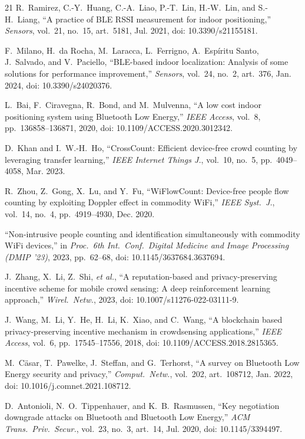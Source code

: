 \documentclass[journal,10pt]{IEEEtran}
\begin{document}
\begin{thebibliography}{21}
 R.~Ramirez, C.-Y.~Huang, C.-A.~Liao, P.-T.~Lin, H.-W.~Lin,
and S.-H.~Liang, ``A practice of BLE RSSI measurement for indoor positioning,''
\emph{Sensors}, vol.~21, no.~15, art.~5181, Jul. 2021, doi: 10.3390/s21155181.

 F.~Milano, H.~da Rocha, M.~Laracca, L.~Ferrigno,
A.~Esp\'iritu Santo, J.~Salvado, and V.~Paciello, ``BLE-based indoor
localization: Analysis of some solutions for performance improvement,''
\emph{Sensors}, vol.~24, no.~2, art.~376, Jan. 2024, doi: 10.3390/s24020376.

 L.~Bai, F.~Ciravegna, R.~Bond, and M.~Mulvenna, ``A low cost
indoor positioning system using Bluetooth Low Energy,'' \emph{IEEE Access},
vol.~8, pp.~136858--136871, 2020, doi: 10.1109/ACCESS.2020.3012342.

 D.~Khan and I.~W.-H.~Ho, ``CrossCount: Efficient device-free
crowd counting by leveraging transfer learning,'' \emph{IEEE Internet Things
J.}, vol.~10, no.~5, pp.~4049--4058, Mar. 2023.

 R.~Zhou, Z.~Gong, X.~Lu, and Y.~Fu, ``WiFlowCount:
Device-free people flow counting by exploiting Doppler effect in commodity
WiFi,'' \emph{IEEE Syst.~J.}, vol.~14, no.~4, pp.~4919--4930, Dec. 2020.

 ``Non-intrusive people counting and identification
simultaneously with commodity WiFi devices,'' in \emph{Proc.\ 6th Int.\ Conf.\
Digital Medicine and Image Processing (DMIP '23)}, 2023, pp.~62--68, doi:
10.1145/3637684.3637694.

 J.~Zhang, X.~Li, Z.~Shi, \emph{et al.}, ``A reputation-based
and privacy-preserving incentive scheme for mobile crowd sensing: A deep
reinforcement learning approach,'' \emph{Wirel.\ Netw.}, 2023, doi:
10.1007/s11276-022-03111-9.

 J.~Wang, M.~Li, Y.~He, H.~Li, K.~Xiao, and C.~Wang, ``A
blockchain based privacy-preserving incentive mechanism in crowdsensing
applications,'' \emph{IEEE Access}, vol.~6, pp.~17545--17556, 2018, doi:
10.1109/ACCESS.2018.2815365.

 M.~C\"asar, T.~Pawelke, J.~Steffan, and G.~Terhorst, ``A
survey on Bluetooth Low Energy security and privacy,'' \emph{Comput.\ Netw.},
vol.~202, art.~108712, Jan. 2022, doi: 10.1016/j.comnet.2021.108712.

 D.~Antonioli, N.~O.~Tippenhauer, and K.~B.~Rasmussen,
``Key negotiation downgrade attacks on Bluetooth and Bluetooth Low Energy,''
\emph{ACM Trans.\ Priv.\ Secur.}, vol.~23, no.~3, art.~14, Jul. 2020, doi:
10.1145/3394497.


\end{thebibliography}
\end{document}

